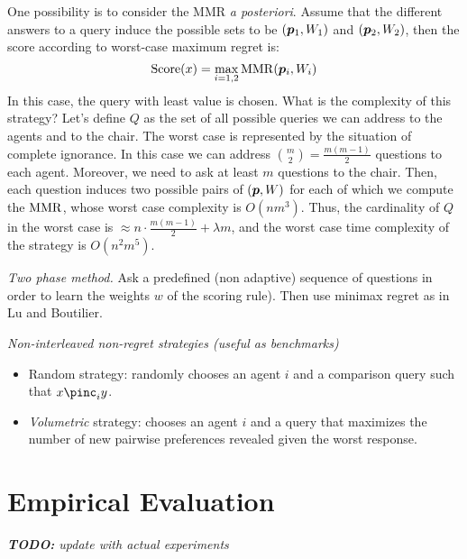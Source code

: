  One possibility is to consider the MMR {\em a posteriori}. Assume that the different answers to a query induce the possible sets to be $({\bm{p}}_1,W_1)$ and $({\bm{p}}_2,W_2)$, then the score according to worst-case maximum regret is:
\[\operatorname{Score}(x)= \max_{i=1,2} \operatorname{MMR}({\bm{p}}_i,W_i) \]
In this case, the query with least value is chosen.
What is the complexity of this strategy? Let's define $Q$ as the set of all possible queries we can address to the agents and to the chair. The worst case is represented by the situation of complete ignorance.
In this case we can address $\binom{m}{2}=\frac{m(m-1)}{2}$ questions to each agent. Moreover, we need to ask at least $m$ questions to the chair. Then, each question induces two possible pairs of $({\bm{p}},W)$ for each of which we compute the $\operatorname{MMR}$, whose worst case complexity is $O(nm^3)$. Thus, the cardinality of $Q$ in the worst case is $\approx n \cdot \frac{m(m-1)}{2} + \lambda m$, and the worst case time complexity of the strategy is $O(n^2m^5)$.

\medskip \noindent
{\em Two phase method.}
Ask a predefined (non adaptive) sequence of questions in order to learn the weights $w$ of the scoring rule).
Then use minimax regret as in Lu and Boutilier.

\medskip \noindent
{\em Non-interleaved non-regret strategies (useful as benchmarks)}	
	\begin{itemize}
		\item Random strategy: randomly chooses an agent $i$ and a comparison query such that $x \pinc_i y$.
		\item {\em Volumetric} strategy: chooses an agent $i$ and a query that maximizes the number of new pairwise preferences revealed given the worst response.
	\end{itemize}


\section{Empirical Evaluation} \label{sec:experiments}

{\em {\bf TODO:} update with actual experiments}


